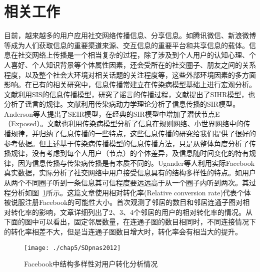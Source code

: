 \section{相关工作}
目前，越来越多的用户应用社交网络传播信息、分享信息。如腾讯微信、新浪微博等成为人们获取信息的重要渠道来源、交互信息的重要平台和共享信息的载体。信息在社交网络上传播是一个相当复杂的过程，除了涉及到个人用户的认知心理、个人喜好、个人知识背景等个体属性因素，还会受所在的社交圈子、朋友之间的关系程度，以及整个社会大环境对相关话题的关注程度等，这些外部环境因素的多方面影响。在已有的相关研究中，信息传播常建立在传染病模型基础上进行宏观分析。文献\cite{huang2011preventing}利用SIS的信息传播模型，研究了谣言的传播过程，文献\cite{zhao2012sihr}提出了SIHR模型，也分析了谣言的规律。文献\cite{zhangyancao2011}利用传染病动力学理论分析了信息传播的SIR模型。Anderson等人\cite{anderson1991infectious}提出了SEIR模型，在经典的SIR模型中增加了潜伏节点E（Exposed）。文献\cite{lu2011small}也利用传染病模型分析了信息在规则网络、小世界网络中的传播规律，并归纳了信息传播的一些特点，这些信息传播的研究给我们提供了很好的参考依据。但上述基于传染病传播模型的信息传播方法，只是从整体角度分析了传播规律，没有考虑到每个人用户（节点）的个体差异，及信息随时间变化的特有规律，因为信息传播与传染病传播是有本质不同的。Ugander等人\cite{ugander2012structural}利用实际Facebook真实数据，实际分析了社交网络中用户接受信息具有的结构多样性的特点。如用户从两个不同圈子听到一条信息其可信程度要远远高于从一个圈子内听到两次。其过程分析如图~\ref{fig:DSpnas2012}所示。这篇文章使用相对转化率(Relative conversion rate)代表个体被说服注册Facebook的可能性大小。首次观测了邻居的数目和邻居连通子图对相对转化率的影响，文章详细列出了2、3、4个邻居的用户的相对转化率的情况。从下面的图中可以看出，固定邻居数量，在连通子图的数目相同时，不同连接情况下的转化率相差不大，但是当连通子图数目增大时，转化率会有相当大的提升。
\begin{figure}[H] %
	\centering
	\texttt{[image: ./chap5/SDpnas2012]}
	\caption{Facebook中结构多样性对用户转化分析情况\cite{ugander2012structural}}
	\label{fig:DSpnas2012}
\end{figure}

